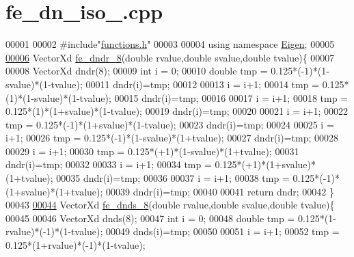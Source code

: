 \hypertarget{fe__dn__iso__8_8cpp_source}{}\section{fe\+\_\+dn\+\_\+iso\+\_.\+cpp}
\label{fe__dn__iso__8_8cpp_source}

\begin{DoxyCode}
00001 
00002 \textcolor{preprocessor}{#include"\hyperlink{functions_8h}{functions.h}"}
00003 
00004 \textcolor{keyword}{using namespace }\hyperlink{namespace_eigen}{Eigen};
00005 
\hyperlink{fe__dn__iso__8_8cpp_afc547bef246c057db6cbd04bf7f866a9}{00006} VectorXd \hyperlink{fe__dn__iso__8_8cpp_afc547bef246c057db6cbd04bf7f866a9}{fe\_dndr\_8}(\textcolor{keywordtype}{double} rvalue,\textcolor{keywordtype}{double} svalue,\textcolor{keywordtype}{double} tvalue)\{
00007 
00008     VectorXd dndr(8);
00009     \textcolor{keywordtype}{int} i = 0;
00010     \textcolor{keywordtype}{double} tmp = 0.125*(-1)*(1-svalue)*(1-tvalue);
00011     dndr(i)=tmp;
00012 
00013     i = i+1;
00014     tmp = 0.125*(1)*(1-svalue)*(1-tvalue);
00015     dndr(i)=tmp;
00016 
00017     i = i+1;
00018         tmp = 0.125*(1)*(1+svalue)*(1-tvalue);
00019     dndr(i)=tmp;
00020 
00021     i = i+1;
00022         tmp = 0.125*(-1)*(1+svalue)*(1-tvalue);
00023     dndr(i)=tmp;
00024 
00025     i = i+1;
00026         tmp = 0.125*(-1)*(1-svalue)*(1+tvalue);
00027     dndr(i)=tmp;
00028 
00029     i = i+1;
00030         tmp = 0.125*(+1)*(1-svalue)*(1+tvalue);
00031     dndr(i)=tmp;
00032 
00033     i = i+1;
00034         tmp = 0.125*(+1)*(1+svalue)*(1+tvalue);
00035     dndr(i)=tmp;
00036 
00037     i = i+1;
00038         tmp = 0.125*(-1)*(1+svalue)*(1+tvalue);
00039     dndr(i)=tmp;
00040 
00041     \textcolor{keywordflow}{return} dndr;
00042 \}
00043 
\hyperlink{fe__dn__iso__8_8cpp_ac0b5524525e1f2e89bb064c15ab8e664}{00044} VectorXd \hyperlink{fe__dn__iso__8_8cpp_ac0b5524525e1f2e89bb064c15ab8e664}{fe\_dnds\_8}(\textcolor{keywordtype}{double} rvalue,\textcolor{keywordtype}{double} svalue,\textcolor{keywordtype}{double} tvalue)\{
00045 
00046     VectorXd dnds(8);
00047     \textcolor{keywordtype}{int} i = 0;
00048     \textcolor{keywordtype}{double} tmp = 0.125*(1-rvalue)*(-1)*(1-tvalue);
00049     dnds(i)=tmp;
00050 
00051     i = i+1;
00052      tmp = 0.125*(1+rvalue)*(-1)*(1-tvalue);

\end{DoxyCode}
